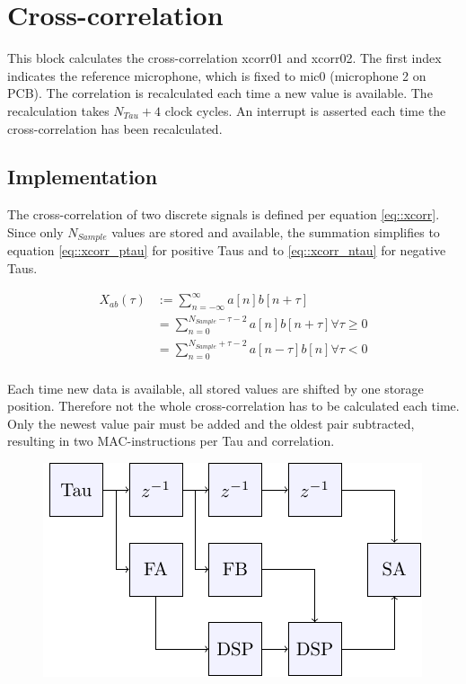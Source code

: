 \section{Cross-correlation}
\label{sec::cic}

This block calculates the cross-correlation xcorr01 and xcorr02.
The first index indicates the reference microphone, which is fixed to mic0 (microphone 2 on PCB).
The correlation is recalculated each time a new value is available.
The recalculation takes $N_{Tau}+4$ clock cycles.
An interrupt is asserted each time the cross-correlation has been recalculated.

\subsection{Implementation}

The cross-correlation of two discrete signals is defined per equation \ref{eq::xcorr}.
Since only $N_{Sample}$ values are stored and available, the summation simplifies to equation \ref{eq::xcorr_ptau} for positive Taus and to \ref{eq::xcorr_ntau} for negative Taus.

\begin{align}
X_{ab}(\tau) &:= \sum_{n=-\infty}^{\infty}a\left[n\right]b\left[n+\tau\right] \label{eq::xcorr}\\
&= \sum_{n=0}^{N_{Sample}-\tau-2}a\left[n\right]b\left[n+\tau\right] \forall\tau\ge0 \label{eq::xcorr_ptau} \\
&= \sum_{n=0}^{N_{Sample}+\tau-2}a\left[n-\tau\right]b\left[n\right] \forall\tau<0 \label{eq::xcorr_ntau} \\	
\end{align}

Each time new data is available, all stored values are shifted by one storage position.
Therefore not the whole cross-correlation has to be calculated each time.
Only the newest value pair must be added and the oldest pair subtracted, resulting in two MAC-instructions per Tau and correlation.

\begin{figure}[htbp]
	\centering
	\includegraphics[scale = 1.5]{block_diagram/xcorr_diag.pdf}
	\label{fig::block_diag}
\end{figure}

